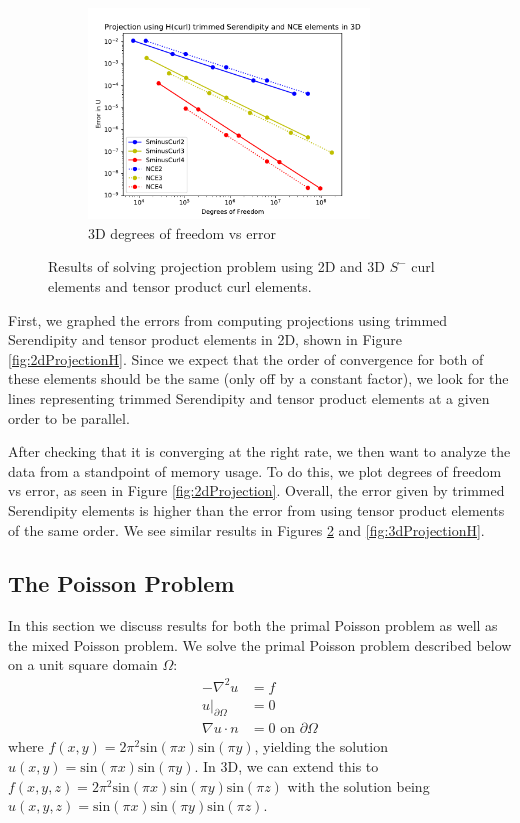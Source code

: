 \documentclass[manuscript,screen]{acmart}
\begin{document}
\begin{figure}[h!]
\begin{subfigure}[h]{0.5\textwidth}
    \includegraphics[height=2.2in]{3dProjectionDofsError.pdf}
    \caption{3D degrees of freedom vs error}
    \label{fig:3dProjectionDofs}
  \end{subfigure}
  \caption{Results of solving projection problem using 2D and 3D $S^-$ curl elements and tensor product curl elements.}
\end{figure}
  
First, we graphed the errors from computing projections using trimmed Serendipity and tensor product elements in 2D, shown in Figure \ref{fig:2dProjectionH}.  Since we expect that the order of convergence for both of these elements should be the same (only off by a constant factor), we look for the lines representing trimmed Serendipity and tensor product elements at a given order to be parallel.
  
After checking that it is converging at the right rate, we then want to analyze the data from a standpoint of memory usage.  To do this, we plot degrees of freedom vs error, as seen in Figure \ref{fig:2dProjection}.  Overall, the error given by trimmed Serendipity elements is higher than the error from using tensor product elements of the same order.   We see similar results in Figures \ref{fig:3dProjectionDofs} and \ref{fig:3dProjectionH}.
  


\newpage
 
\subsection{The Poisson Problem}
In this section we discuss results for both the primal Poisson problem as well as the mixed Poisson problem.  We solve the primal Poisson problem described below on a unit square domain $\Omega$:
\begin{align}
    -\nabla^2 u &= f \\
    u\vert_{\partial \Omega} &= 0 \\
    \nabla u \cdot n &= 0 \text{ on } \partial \Omega
\end{align}
where $f(x,y) = 2\pi^2\text{sin}(\pi x)\text{sin}(\pi y) $, yielding the solution $u(x,y) = \text{sin}(\pi x)\text{sin}(\pi y)$. In 3D, we can extend this to $f(x,y,z) = 2\pi^2\text{sin}(\pi x)\text{sin}(\pi y)\text{sin}(\pi z)$ with the solution being $u(x,y,z) = \text{sin}(\pi x)\text{sin}(\pi y)\text{sin}(\pi z)$.  
\end{document}
